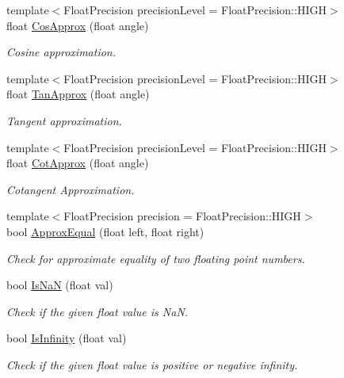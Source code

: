 \begin{DoxyCompactItemize}
{\footnotesize template$<$Float\+Precision precision\+Level = Float\+Precision\+::\+H\+I\+G\+H$>$ }\\float \hyperlink{group___s_i_s_d_scalar_math_ga4c7f22bb5c746703d834991b074e2721}{Cos\+Approx} (float angle)
\begin{DoxyCompactList}\small\item\em Cosine approximation. \end{DoxyCompactList}\item 
{\footnotesize template$<$Float\+Precision precision\+Level = Float\+Precision\+::\+H\+I\+G\+H$>$ }\\float \hyperlink{group___s_i_s_d_scalar_math_gac117306c04c7d0b931c3b2b4eb4fd6ae}{Tan\+Approx} (float angle)
\begin{DoxyCompactList}\small\item\em Tangent approximation. \end{DoxyCompactList}\item 
{\footnotesize template$<$Float\+Precision precision\+Level = Float\+Precision\+::\+H\+I\+G\+H$>$ }\\float \hyperlink{group___s_i_s_d_scalar_math_ga6914719e1538a2c1d58828197bc76041}{Cot\+Approx} (float angle)
\begin{DoxyCompactList}\small\item\em Cotangent Approximation. \end{DoxyCompactList}\item 
{\footnotesize template$<$Float\+Precision precision = Float\+Precision\+::\+H\+I\+G\+H$>$ }\\bool \hyperlink{group___s_i_s_d_scalar_math_ga384f6df082ace9bc432bac8fac5b6686}{Approx\+Equal} (float left, float right)
\begin{DoxyCompactList}\small\item\em Check for approximate equality of two floating point numbers. \end{DoxyCompactList}\item 
bool \hyperlink{group___s_i_s_d_scalar_math_ga894ca122cd6d482ed5608f3410bc2bb4}{Is\+Na\+N} (float val)
\begin{DoxyCompactList}\small\item\em Check if the given float value is Na\+N. \end{DoxyCompactList}\item 
bool \hyperlink{group___s_i_s_d_scalar_math_ga29ffc432e0aaaa5201bfca15247fa648}{Is\+Infinity} (float val)
\begin{DoxyCompactList}\small\item\em Check if the given float value is positive or negative infinity. \end{DoxyCompactList}\end{DoxyCompactItemize}
